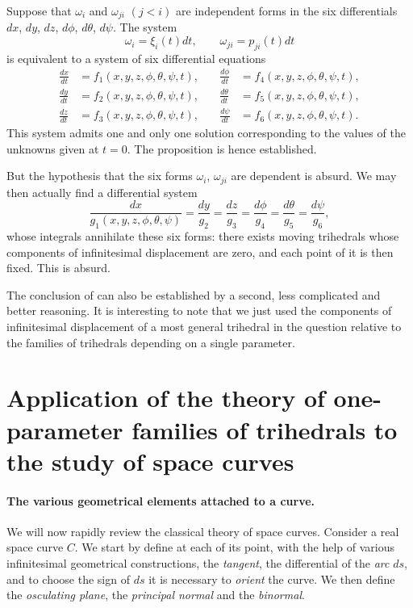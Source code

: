 Suppose that $\omega_{i}$ and $\omega_{ji}$ $(j<i)$ are independent forms in the six differentials $dx$, $dy$, $dz$, $d\phi$, $d\theta$, $d\psi$. The system
\[
\omega_{i}=\xi_{i}(t)dt,\qquad\omega_{ji}=p_{ji}(t)dt
\]
is equivalent to a system of six differential equations
\begin{align*}
  \frac{dx}{dt}&=f_{1}(x,y,z,\phi,\theta,\psi,t),\quad&
  \frac{d\phi}{dt}&=f_{4}(x,y,z,\phi,\theta,\psi,t),\\
  \frac{dy}{dt}&=f_{2}(x,y,z,\phi,\theta,\psi,t),\quad&
  \frac{d\theta}{dt}&=f_{5}(x,y,z,\phi,\theta,\psi,t),\\
  \frac{dz}{dt}&=f_{3}(x,y,z,\phi,\theta,\psi,t),\quad&
  \frac{d\psi}{dt}&=f_{6}(x,y,z,\phi,\theta,\psi,t).  
\end{align*}
This system admits one and only one solution corresponding to the values of the unknowns given at $t=0$. The proposition is hence established.

But the hypothesis that the six forms $\omega_{i}$, $\omega_{ji}$ are dependent is absurd. We may then actually find a differential system
\[
\frac{dx}{g_{1}(x,y,z,\phi,\theta,\psi)}=\frac{dy}{g_{2}}=\frac{dz}{g_{3}}=\frac{d\phi}{g_{4}}=\frac{d\theta}{g_{5}}=\frac{d\psi}{g_{6}},
\]
whose integrals annihilate these six forms: there exists moving trihedrals whose components of infinitesimal displacement are zero, and each point of it is then fixed. This is absurd.

The conclusion of  can also be established by a second, less complicated and better reasoning. It is interesting to note that we just used the components of infinitesimal displacement of a most general trihedral in the question relative to the families of trihedrals depending on a single parameter.

\section[{Application of the theory of one-parameter families of trihedrals to space curves}]{Application of the theory of one-parameter families of trihedrals to the study of space curves}
\label{sec:appl-theory-one}

\paragraph{The various geometrical elements attached to a curve.}
\label{sec:9}
We will now rapidly review the classical theory of space curves. Consider a real space curve $C$. We start by define at each of its point, with the help of various infinitesimal geometrical constructions, the \emph{tangent}, the differential of the \emph{arc} $ds$, and to choose the sign of $ds$ it is necessary to \emph{orient} the curve. We then define the \emph{osculating plane}, the \emph{principal normal} and the \emph{binormal}.

